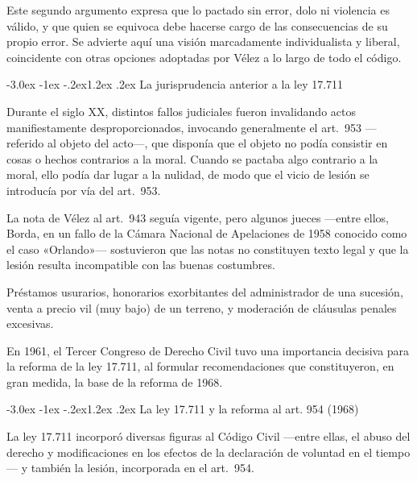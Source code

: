 \documentclass[12pt,oneside]{book}
\makeatletter
\renewcommand\section{\@startsection{section}{1}{\z@}%
  {-3.0ex \@plus -1ex \@minus -.2ex}{1.2ex \@plus .2ex}%
  {\normalfont\large\bfseries\color{acento}}}
\makeatother
\begin{document}
Este segundo argumento expresa que lo pactado sin error, dolo ni violencia es válido, y que quien se equivoca debe hacerse cargo de las consecuencias de su propio error. Se advierte aquí una visión marcadamente individualista y liberal, coincidente con otras opciones adoptadas por Vélez a lo largo de todo el código.

\section{La jurisprudencia anterior a la ley 17.711}

Durante el siglo XX, distintos fallos judiciales fueron invalidando actos manifiestamente desproporcionados, invocando generalmente el art.\ 953 ---referido al objeto del acto---, que disponía que el objeto no podía consistir en cosas o hechos contrarios a la moral. Cuando se pactaba algo contrario a la moral, ello podía dar lugar a la nulidad, de modo que el vicio de lesión se introducía por vía del art.\ 953.

La nota de Vélez al art.\ 943 seguía vigente, pero algunos jueces ---entre ellos, Borda, en un fallo de la Cámara Nacional de Apelaciones de 1958 conocido como el caso «Orlando»--- sostuvieron que las notas no constituyen texto legal y que la lesión resulta incompatible con las buenas costumbres.

\begin{ejemplo}
Préstamos usurarios, honorarios exorbitantes del administrador de una sucesión, venta a precio vil (muy bajo) de un terreno, y moderación de cláusulas penales excesivas.
\end{ejemplo}

En 1961, el Tercer Congreso de Derecho Civil tuvo una importancia decisiva para la reforma de la ley 17.711, al formular recomendaciones que constituyeron, en gran medida, la base de la reforma de 1968.

\section{La ley 17.711 y la reforma al art. 954 (1968)}

La ley 17.711 incorporó diversas figuras al Código Civil ---entre ellas, el abuso del derecho y modificaciones en los efectos de la declaración de voluntad en el tiempo--- y también la lesión, incorporada en el art.\ 954.
\end{document}
